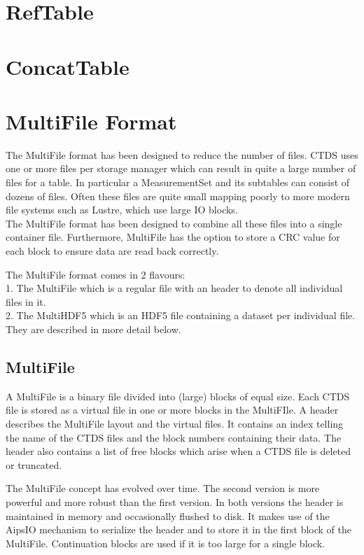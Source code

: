 \section{RefTable}

\section{ConcatTable}

\section{\label{CTDS:MULTIFILE}MultiFile Format}
The MultiFile format has been designed to reduce the number of
files. CTDS uses one or more files per storage manager which can
result in quite a large number of files for a table.
In particular a MeasurementSet and its subtables can consist of dozens
of files. Often these files are quite small mapping poorly to more
modern file systems such as Lustre, which use large IO blocks.
\\The MultiFile format has been designed to combine all these files into a single
container file. Furthermore, MultiFile has the option to store a CRC
value for each block to ensure data are read back correctly.

The MultiFile format comes in 2 flavours:
\\1. The MultiFile which is a regular file with an header to denote all
individual files in it.
\\2. The MultiHDF5 which is an HDF5 file containing a dataset per
individual file. 
\\They are described in more detail below.

\subsection{MultiFile}
A MultiFile is a binary file divided into (large) blocks of equal size. Each CTDS
file is stored as a virtual file in one or more blocks in the MultiFIle.
A header describes the MultiFile layout and the virtual files. It contains an index telling
the name of the CTDS files and the block numbers containing their data.
The header also contains a list of free blocks which arise when a CTDS file is
deleted or truncated.

The MultiFile concept has evolved over time. The second version is
more powerful and more robust than the first version.
In both versions the header is maintained in memory and occasionally
flushed to disk.
It makes use of the AipsIO mechanism to serialize the header and to store
it in the first block of the MultiFile. Continuation blocks are used if it is
too large for a single block.  

